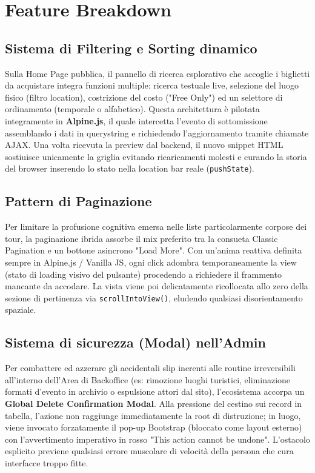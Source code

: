 \section{Feature Breakdown}

\subsection{Sistema di Filtering e Sorting dinamico}
Sulla Home Page pubblica, il pannello di ricerca esplorativo che accoglie i biglietti da acquistare integra funzioni multiple: ricerca testuale live, selezione del luogo fisico (filtro location), costrizione del costo ("Free Only") ed un selettore di ordinamento (temporale o alfabetico). Questa architettura è pilotata integramente in \textbf{Alpine.js}, il quale intercetta l'evento di sottomissione assemblando i dati in querystring e richiedendo l'aggiornamento tramite chiamate AJAX. Una volta ricevuta la preview dal backend, il nuovo snippet HTML sostiuisce unicamente la griglia evitando ricaricamenti molesti e curando la storia del browser inserendo lo stato nella location bar reale (\texttt{pushState}).

\subsection{Pattern di Paginazione}
Per limitare la profusione cognitiva emersa nelle liste particolarmente corpose dei tour, la paginazione ibrida assorbe il mix preferito tra la consueta Classic Pagination e un bottone asincrono "Load More". Con un'anima reattiva definita sempre in Alpine.js / Vanilla JS, ogni click adombra temporaneamente la view (stato di loading visivo del pulsante) procedendo a richiedere il frammento mancante da accodare. La vista viene poi delicatamente ricollocata allo zero della sezione di pertinenza via \texttt{scrollIntoView()}, eludendo qualsiasi disorientamento spaziale.

\subsection{Sistema di sicurezza (Modal) nell'Admin}
Per combattere ed azzerare gli accidentali slip inerenti alle routine irreversibili all'interno dell'Area di Backoffice (es: rimozione luoghi turistici, eliminazione formati d'evento in archivio o espulsione attori dal sito), l'ecosistema accorpa un \textbf{Global Delete Confirmation Modal}. Alla pressione del cestino sui record in tabella, l'azione non raggiunge immediatamente la root di distruzione; in luogo, viene invocato forzatamente il pop-up Bootstrap (bloccato come layout esterno) con l'avvertimento imperativo in rosso "This action cannot be undone". L'ostacolo esplicito previene qualsiasi errore muscolare di velocità della persona che cura interfacce troppo fitte.

